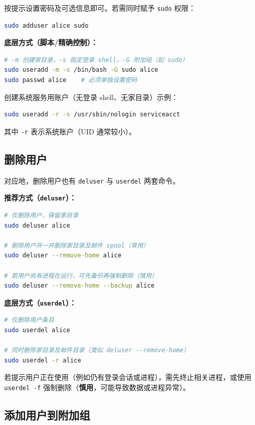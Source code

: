 按提示设置密码及可选信息即可。若需同时赋予 \texttt{sudo} 权限：

\begin{lstlisting}[language=sh]
sudo adduser alice sudo
\end{lstlisting}

\textbf{底层方式（脚本/精确控制）：}

\begin{lstlisting}[language=sh]
# -m 创建家目录，-s 指定登录 shell，-G 附加组（如 sudo）
sudo useradd -m -s /bin/bash -G sudo alice
sudo passwd alice    # 必须单独设置密码
\end{lstlisting}

创建系统服务用账户（无登录 shell、无家目录）示例：

\begin{lstlisting}[language=sh]
sudo useradd -r -s /usr/sbin/nologin serviceacct
\end{lstlisting}

其中 \texttt{-r} 表示系统账户（UID 通常较小）。

\subsection{删除用户}

对应地，删除用户也有 \texttt{deluser} 与 \texttt{userdel} 两套命令。

\textbf{推荐方式（\texttt{deluser}）：}

\begin{lstlisting}[language=sh]
# 仅删除用户，保留家目录
sudo deluser alice

# 删除用户并一并删除家目录及邮件 spool（常用）
sudo deluser --remove-home alice

# 若用户尚有进程在运行，可先备份再强制删除（慎用）
sudo deluser --remove-home --backup alice
\end{lstlisting}

\textbf{底层方式（\texttt{userdel}）：}

\begin{lstlisting}[language=sh]
# 仅删除用户条目
sudo userdel alice

# 同时删除家目录及邮件目录（类似 deluser --remove-home）
sudo userdel -r alice
\end{lstlisting}

若提示用户正在使用（例如仍有登录会话或进程），需先终止相关进程，或使用 \texttt{userdel -f} 强制删除（\textbf{慎用}，可能导致数据或进程异常）。

\subsection{添加用户到附加组}

